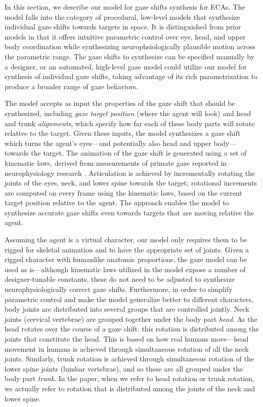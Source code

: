 In this section, we describe our model for gaze shifts synthesis for ECAs. The model falls into the category of procedural, low-level models that synthesize individual gaze shifts towards targets in space. It is distinguished from prior models in that it offers intuitive parametric control over eye, head, and upper body coordination while synthesizing neurophsiologically plausible motion across the parametric range. The gaze shifts to synthesize can be specified manually by a designer, or an automated, high-level gaze model could utilize our model for synthesis of individual gaze shifts, taking advantage of its rich parametrization to produce a broader range of gaze behaviors.

The model accepts as input the properties of the gaze shift that should be synthesized, including \emph{gaze target position} (where the agent will look) and head and trunk \emph{alignments}, which specify how far each of these body parts will rotate relative to the target. Given these inputs, the model synthesizes a gaze shift which turns the agent's eyes---and potentially also head and upper body---towards the target. The animation of the gaze shift is generated using a set of kinematic laws, derived from measurements of primate gaze reported in neurophysiology research \cite{guitton1987gaze,mccluskey2007monkeys}. Articulation is achieved by incrementally rotating the joints of the eyes, neck, and lower spine towards the target; rotational increments are computed on every frame using the kinematic laws, based on the current target position relative to the agent. The approach enables the model to synthesize accurate gaze shifts even towards targets that are moving relative the agent.

Assuming the agent is a virtual character, our model only requires them to be rigged for skeletal animation and to have the appropriate set of joints. Given a rigged character with humanlike anatomic proportions, the gaze model can be used as is---although kinematic laws utilized in the model expose a number of designer-tunable constants, these do not need to be adjusted to synthesize neurophysiologically correct gaze shifts. Furthermore, in order to simplify parametric control and make the model generalize better to different characters, body joints are distributed into several groups that are controlled jointly. Neck joints (cervical vertebrae) are grouped together under the body part \emph{head}. As the head rotates over the course of a gaze shift, this rotation is distributed among the joints that constitute the head. This is based on how real humans move---head movement in humans is achieved through simultaneous rotation of all the neck joints. Similarly, trunk rotation is achieved through simultaneous rotation of the lower spine joints (lumbar vertebrae), and so these are all grouped under the body part \emph{trunk}. In the paper, when we refer to head rotation or trunk rotation, we actually refer to rotation that is distributed among the joints of the neck and lower spine.

